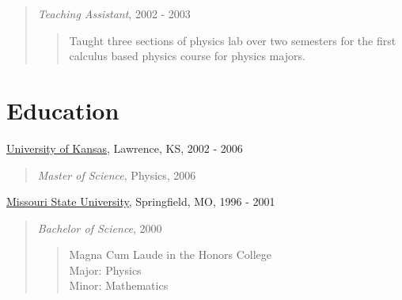 \begin{resume}
\begin{quote}
\emph{Teaching Assistant},  2002 - 2003
\begin{quote}
Taught three sections of physics lab over two semesters for the first
calculus based physics course for physics majors.
\end{quote}
\end{quote}

\section{Education} 

\underline{University of Kansas}, Lawrence, KS, 2002 - 2006\\

\begin{quote}
\emph{Master of Science}, Physics, 2006 
\end{quote}

\underline{Missouri State University}, Springfield, MO, 1996 - 2001\\

\begin{quote}
\emph{Bachelor of Science}, 2000 
\begin{quote}
Magna Cum Laude in the Honors College\\
Major: Physics\\ 
Minor: Mathematics\\ 
\end{quote}
\end{quote}


\end{resume}

